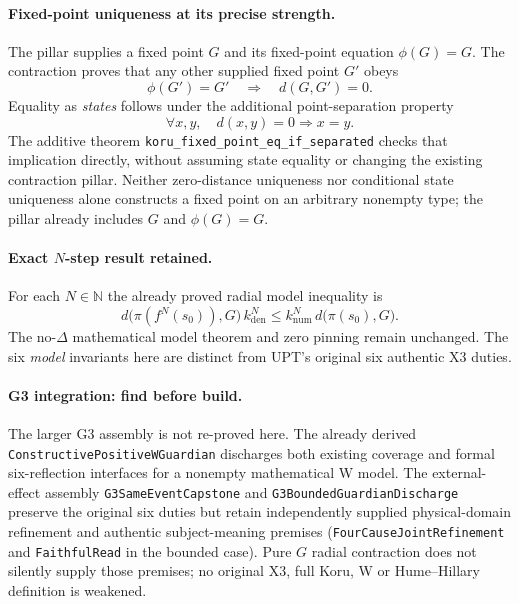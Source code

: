 \paragraph{Fixed-point uniqueness at its precise strength.}
The pillar supplies a fixed point $G$ and its fixed-point equation
$\phi(G)=G$. The contraction proves that any other supplied fixed
point $G'$ obeys
\[
 \phi(G')=G'\quad\Longrightarrow\quad d(G,G')=0.
\]
Equality as \emph{states} follows under the additional point-separation
property
\[
 \forall x,y,\quad d(x,y)=0\Longrightarrow x=y.
\]
The additive theorem \texttt{koru\_fixed\_point\_eq\_if\_separated}
checks that implication directly, without assuming state equality or
changing the existing contraction pillar. Neither zero-distance
uniqueness nor conditional state uniqueness alone constructs a fixed
point on an arbitrary nonempty type; the pillar already includes
$G$ and $\phi(G)=G$.

\paragraph{Exact $N$-step result retained.}
For each $N\in\mathbb N$ the already proved radial model inequality is
\[
 d\bigl(\pi(f^N(s_0)),G\bigr)\,k_{\mathrm{den}}^N
 \leq k_{\mathrm{num}}^N\,d\bigl(\pi(s_0),G\bigr).
\]
The no-$\Delta$ mathematical model theorem and zero pinning remain
unchanged. The six \emph{model} invariants here are distinct from UPT's
original six authentic X3 duties.

\paragraph{G3 integration: find before build.}
The larger G3 assembly is not re-proved here. The already derived
\texttt{ConstructivePositiveWGuardian} discharges both existing
coverage and formal six-reflection interfaces for a nonempty
mathematical W model. The external-effect assembly
\texttt{G3SameEventCapstone} and
\texttt{G3BoundedGuardianDischarge} preserve the original six duties
but retain independently supplied physical-domain refinement and
authentic subject-meaning premises (\texttt{FourCauseJointRefinement}
and \texttt{FaithfulRead} in the bounded case). Pure $G$ radial
contraction does not silently supply those premises; no original
X3, full Koru, W or Hume--Hillary definition is weakened.


